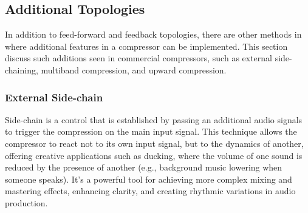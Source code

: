 \documentclass[10pt]{article}
\begin{document}
\begin{multicols*}{2}
\begin{minipage}{\linewidth}
                        
                        \label{fig:feedforward}
                    
                    \end{minipage}
                
                \vspace{2ex}

            \subsection{Additional Topologies}
                In addition to feed-forward and feedback topologies, there are other methods in where additional features in a compressor can be implemented. This section discuss such additions seen in commercial compressors, such as external side-chaining, multiband compression, and upward compression.

                \subsubsection{External Side-chain}
                    Side-chain is a control that is established by passing an additional audio signals to trigger the compression on the main input signal. This technique allows the compressor to react not to its own input signal, but to the dynamics of another, offering creative applications such as ducking, where the volume of one sound is reduced by the presence of another (e.g., background music lowering when someone speaks). It's a powerful tool for achieving more complex mixing and mastering effects, enhancing clarity, and creating rhythmic variations in audio production.


\end{multicols*}
\end{document}
